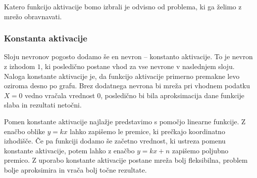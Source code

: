 \documentclass[mat1]{fmfdelo}
\begin{document}
Katero funkcijo aktivacije bomo izbrali je odvisno od problema, ki ga želimo z mrežo obravnavati.
%
\subsubsection{Konstanta aktivacije} \label{bias}
Sloju nevronov pogosto dodamo še en nevron -- konstanto aktivacije. To je nevron z izhodom $1$, ki posledično postane vhod za vse nevrone v naslednjem sloju. Naloga konstante aktivacije je, da funkcijo aktivacije primerno premakne levo oziroma desno po grafu. Brez dodatnega nevrona bi mreža pri vhodnem podatku $X=0$ vedno vračala vrednost $0$, posledično bi bila aproksimacija dane funkcije slaba in rezultati netočni. 

Pomen konstante aktivacije najlažje predstavimo s pomočjo linearne funkcije. Z enačbo oblike $y = kx$ lahko zapišemo le premice, ki prečkajo koordinatno izhodišče. Če pa funkciji dodamo še začetno vrednost, ki ustreza pomenu konstante aktivacije, potem lahko z enačbo $y= kx + n$ zapišemo poljubno premico. Z uporabo konstante aktivacije postane mreža bolj fleksibilna, problem bolje aproksimira in vrača bolj točne rezultate. 
%
\end{document}
